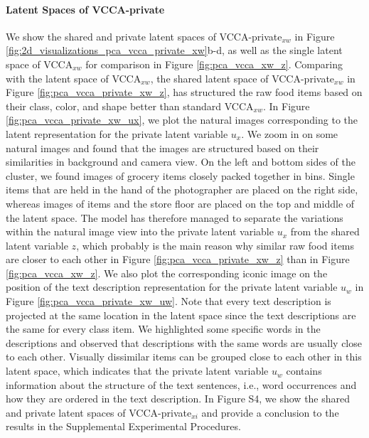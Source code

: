 \paragraph{Latent Spaces of VCCA-private } We show the shared and private latent spaces of VCCA-private$_{x w}$ in Figure \ref{fig:2d_visualizations_pca_vcca_private_xw}b-d, as well as the single latent space of VCCA$_{x w}$ for comparison in Figure \ref{fig:pca_vcca_xw_z}. 
Comparing with the latent space of VCCA$_{x w}$, the shared latent space of VCCA-private$_{x w}$ in Figure \ref{fig:pca_vcca_private_xw_z}, has structured the raw food items based on their class, color, and shape better than standard VCCA$_{x w}$. In Figure \ref{fig:pca_vcca_private_xw_ux}, we plot the natural images corresponding to the latent representation for the private latent variable $u_{x}$. We zoom in on some natural images and found that the images are structured based on their similarities in background and camera view. On the left and bottom sides of the cluster, we found images of grocery items closely packed together in bins. Single items that are held in the hand of the photographer are placed on the right side, whereas images of items and the store floor are placed on the top and middle of the latent space. The model has therefore managed to separate the variations within the natural image view into the private latent variable $u_{x}$ from the shared latent variable $z$, which probably is the main reason why similar raw food items are closer to each other in Figure \ref{fig:pca_vcca_private_xw_z} than in Figure \ref{fig:pca_vcca_xw_z}. We also plot the corresponding iconic image on the position of the text description representation for the private latent variable $u_{w}$ in Figure \ref{fig:pca_vcca_private_xw_uw}. Note that every text description is projected at the same location in the latent space since the text descriptions are the same for every class item. We highlighted some specific words in the descriptions and observed that descriptions with the same words are usually close to each other. Visually dissimilar items can be grouped close to each other in this latent space, which indicates that the private latent variable $u_{w}$ contains information about the structure of the text sentences, i.e., word occurrences and how they are ordered in the text description. 
In Figure S4, we show the shared and private latent spaces of VCCA-private$_{x i}$ and provide a conclusion to the results in the 
Supplemental Experimental Procedures.

